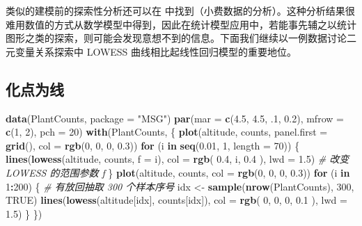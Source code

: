 \documentclass[
  b5paper,
  UTF8,twoside]{book}
\newenvironment{Shaded}{\begin{snugshade}}{\end{snugshade}}
\newcommand{\AttributeTok}[1]{\textcolor[rgb]{0.13,0.29,0.53}{#1}}
\newcommand{\CommentTok}[1]{\textcolor[rgb]{0.56,0.35,0.01}{\textit{#1}}}
\newcommand{\ConstantTok}[1]{\textcolor[rgb]{0.56,0.35,0.01}{#1}}
\newcommand{\ControlFlowTok}[1]{\textcolor[rgb]{0.13,0.29,0.53}{\textbf{#1}}}
\newcommand{\DecValTok}[1]{\textcolor[rgb]{0.00,0.00,0.81}{#1}}
\newcommand{\FloatTok}[1]{\textcolor[rgb]{0.00,0.00,0.81}{#1}}
\newcommand{\FunctionTok}[1]{\textcolor[rgb]{0.13,0.29,0.53}{\textbf{#1}}}
\newcommand{\NormalTok}[1]{#1}
\newcommand{\OtherTok}[1]{\textcolor[rgb]{0.56,0.35,0.01}{#1}}
\newcommand{\SpecialCharTok}[1]{\textcolor[rgb]{0.81,0.36,0.00}{\textbf{#1}}}
\newcommand{\StringTok}[1]{\textcolor[rgb]{0.31,0.60,0.02}{#1}}
\begin{document}
类似的建模前的探索性分析还可以在 \citet{Cook07} 中找到（小费数据的分析）。这种分析结果很难用数值的方式从数学模型中得到，因此在统计模型应用中，若能事先辅之以统计图形之类的探索，则可能会发现意想不到的信息。下面我们继续以一例数据讨论二元变量关系探索中 LOWESS 曲线相比起线性回归模型的重要地位。

\subsection{化点为线}\label{subsec:lowess}

\begin{Shaded}
\begin{Highlighting}[]
\FunctionTok{data}\NormalTok{(PlantCounts, }\AttributeTok{package =} \StringTok{"MSG"}\NormalTok{)}
\FunctionTok{par}\NormalTok{(}\AttributeTok{mar =} \FunctionTok{c}\NormalTok{(}\FloatTok{4.5}\NormalTok{, }\FloatTok{4.5}\NormalTok{, .}\DecValTok{1}\NormalTok{, }\FloatTok{0.2}\NormalTok{), }\AttributeTok{mfrow =} \FunctionTok{c}\NormalTok{(}\DecValTok{1}\NormalTok{, }\DecValTok{2}\NormalTok{), }\AttributeTok{pch =} \DecValTok{20}\NormalTok{)}
\FunctionTok{with}\NormalTok{(PlantCounts, \{}
  \FunctionTok{plot}\NormalTok{(altitude, counts, }\AttributeTok{panel.first =} \FunctionTok{grid}\NormalTok{(), }\AttributeTok{col =} \FunctionTok{rgb}\NormalTok{(}\DecValTok{0}\NormalTok{, }\DecValTok{0}\NormalTok{, }\DecValTok{0}\NormalTok{, }\FloatTok{0.3}\NormalTok{))}
  \ControlFlowTok{for}\NormalTok{ (i }\ControlFlowTok{in} \FunctionTok{seq}\NormalTok{(}\FloatTok{0.01}\NormalTok{, }\DecValTok{1}\NormalTok{, }\AttributeTok{length =} \DecValTok{70}\NormalTok{)) \{}
    \FunctionTok{lines}\NormalTok{(}\FunctionTok{lowess}\NormalTok{(altitude, counts, }\AttributeTok{f =}\NormalTok{ i), }\AttributeTok{col =} \FunctionTok{rgb}\NormalTok{(}
      \FloatTok{0.4}\NormalTok{,}
\NormalTok{      i, }\FloatTok{0.4}
\NormalTok{    ), }\AttributeTok{lwd =} \FloatTok{1.5}\NormalTok{) }\CommentTok{\# 改变 LOWESS 的范围参数 f}
\NormalTok{  \}}
  \FunctionTok{plot}\NormalTok{(altitude, counts, }\AttributeTok{col =} \FunctionTok{rgb}\NormalTok{(}\DecValTok{0}\NormalTok{, }\DecValTok{0}\NormalTok{, }\DecValTok{0}\NormalTok{, }\FloatTok{0.3}\NormalTok{))}
  \ControlFlowTok{for}\NormalTok{ (i }\ControlFlowTok{in} \DecValTok{1}\SpecialCharTok{:}\DecValTok{200}\NormalTok{) \{}
    \CommentTok{\# 有放回抽取 300 个样本序号}
\NormalTok{    idx }\OtherTok{\textless{}{-}} \FunctionTok{sample}\NormalTok{(}\FunctionTok{nrow}\NormalTok{(PlantCounts), }\DecValTok{300}\NormalTok{, }\ConstantTok{TRUE}\NormalTok{)}
    \FunctionTok{lines}\NormalTok{(}\FunctionTok{lowess}\NormalTok{(altitude[idx], counts[idx]), }\AttributeTok{col =} \FunctionTok{rgb}\NormalTok{(}
      \DecValTok{0}\NormalTok{,}
      \DecValTok{0}\NormalTok{, }\DecValTok{0}\NormalTok{, }\FloatTok{0.1}
\NormalTok{    ), }\AttributeTok{lwd =} \FloatTok{1.5}\NormalTok{)}
\NormalTok{  \}}
\NormalTok{\})}
\end{Highlighting}
\end{Shaded}
\end{document}
